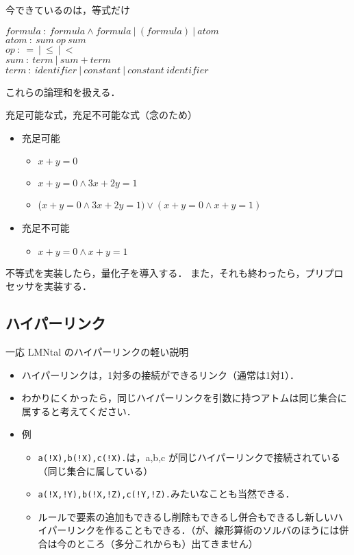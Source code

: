 今できているのは，等式だけ
\begin{center}
    $formula\: :\: formula\wedge formula \:|\: (formula) \:|\: atom$\\
    $atom \::\: sum \: op \: sum$\\
    $op \::\: = \:|\: $\sout{$\leq$}$ \:|\: $\sout{$<$}\\
    $sum \::\: term \:|\: sum+term$\\
    $term \::\: identifier \:|\: constant \:|\: constant \: identifier$
\end{center}

これらの論理和を扱える．

充足可能な式，充足不可能な式（念のため）
\renewcommand{\labelitemii}{$\circ$}
\begin{itemize}
    \item 充足可能
    \begin{itemize}
        \item $x + y = 0$
        \item $x + y = 0 \wedge 3x + 2y = 1$
        \item ($x + y = 0 \wedge 3x + 2y = 1) \vee
                (x + y = 0 \wedge x + y = 1)$
    \end{itemize}
    \item 充足不可能
    \begin{itemize}
        \item $x + y = 0 \wedge x + y = 1$
    \end{itemize}
\end{itemize}

不等式を実装したら，量化子を導入する．
また，それも終わったら，プリプロセッサを実装する．


\subsection*{ハイパーリンク}
一応 LMNtal のハイパーリンクの軽い説明
\begin{itemize}
    \item ハイパーリンクは，1対多の接続ができるリンク（通常は1対1）．
    \item わかりにくかったら，同じハイパーリンクを引数に持つアトムは同じ集合に属すると考えてください．
    \item 例
    \begin{itemize}
        \item \texttt{a(!X),b(!X),c(!X).}は，a,b,c が同じハイパーリンクで接続されている（同じ集合に属している）
        \item \texttt{a(!X,!Y),b(!X,!Z),c(!Y,!Z).}みたいなことも当然できる．
        \item ルールで要素の追加もできるし削除もできるし併合もできるし新しいハイパーリンクを作ることもできる．（が、線形算術のソルバのほうには併合は今のところ（多分これからも）出てきません）
    \end{itemize}
\end{itemize}






